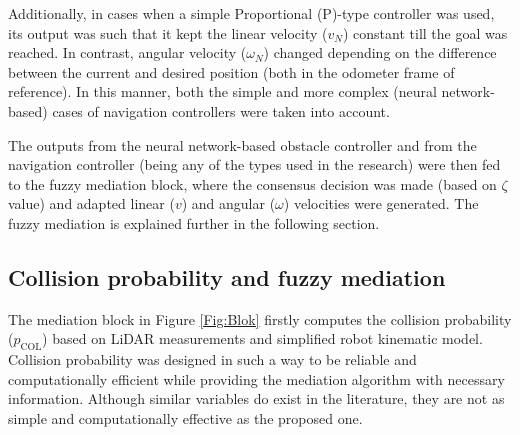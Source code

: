 Additionally, in cases when a simple Proportional (P)-type controller was used, its output was such that it kept the linear velocity ($v_N$) constant till the goal was reached. In contrast, angular velocity ($\omega_N$) changed depending on the difference between the current and desired position (both in the odometer frame of reference). In this manner, both the simple and more complex (neural network-based) cases of navigation controllers were taken into account.

The outputs from the neural network-based obstacle controller and from the navigation controller (being any of the types used in the research) were then fed to the fuzzy mediation block, where the consensus decision was made (based on $\zeta$ value) and adapted linear ($v$) and angular ($\omega$) velocities were generated. The fuzzy mediation is explained further in the following section.

\subsection{Collision probability and fuzzy mediation}

 The mediation block in Figure \ref{Fig:Blok} firstly computes the collision probability ($p_{\textrm{COL}}$) based on LiDAR measurements and simplified robot kinematic model. Collision probability was designed in such a way to be reliable and computationally efficient while providing the mediation algorithm with necessary information. Although similar variables do exist in the literature, they are not as simple and computationally effective \cite{Coenen2014} as the proposed one.

